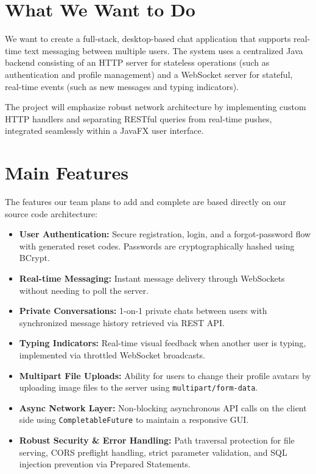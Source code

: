 \documentclass[11pt]{article}
\begin{document}
\section{What We Want to Do}

We want to create a full-stack, desktop-based chat application that supports real-time text messaging between multiple users. The system uses a centralized Java backend consisting of an HTTP server for stateless operations (such as authentication and profile management) and a WebSocket server for stateful, real-time events (such as new messages and typing indicators).

The project will emphasize robust network architecture by implementing custom HTTP handlers and separating RESTful queries from real-time pushes, integrated seamlessly within a JavaFX user interface.

\section{Main Features}

The features our team plans to add and complete are based directly on our source code architecture:

\begin{itemize}
    \item \textbf{User Authentication:} Secure registration, login, and a forgot-password flow with generated reset codes. Passwords are cryptographically hashed using BCrypt.
    \item \textbf{Real-time Messaging:} Instant message delivery through WebSockets without needing to poll the server.
    \item \textbf{Private Conversations:} 1-on-1 private chats between users with synchronized message history retrieved via REST API.
    \item \textbf{Typing Indicators:} Real-time visual feedback when another user is typing, implemented via throttled WebSocket broadcasts.
    \item \textbf{Multipart File Uploads:} Ability for users to change their profile avatars by uploading image files to the server using \texttt{multipart/form-data}.
    \item \textbf{Async Network Layer:} Non-blocking asynchronous API calls on the client side using \texttt{CompletableFuture} to maintain a responsive GUI.
    \item \textbf{Robust Security \& Error Handling:} Path traversal protection for file serving, CORS preflight handling, strict parameter validation, and SQL injection prevention via Prepared Statements.
\end{itemize}
\end{document}
